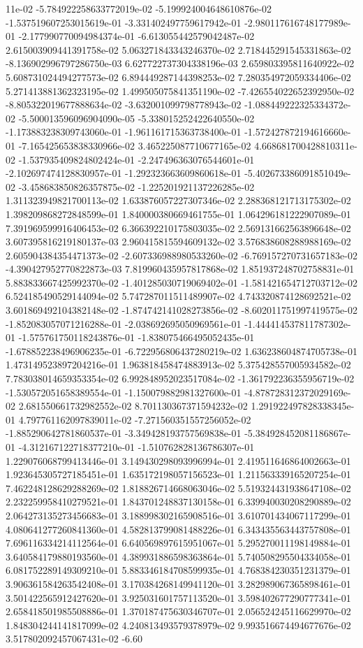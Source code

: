 11e-02	-5.784922258633772019e-02	-5.199924004648610876e-02	-1.537519607253015619e-01	-3.331402497759617942e-01	-2.980117616748177989e-01	-2.177990770094984374e-01	-6.613055442579042487e-02	2.615003909441391758e-02	5.063271843343246370e-02	2.718445291545331863e-02	-8.136902996797286750e-03	6.627722737304338196e-03	2.659803395811640922e-02	5.608731024494277573e-02	6.894449287144398253e-02	7.280354972059334406e-02	5.271413881362323195e-02	1.499505075841351190e-02	-7.426554022652392950e-02	-8.805322019677888634e-02	-3.632001099798778943e-02	-1.088449222325334372e-02	-5.500013596096904090e-05	-5.338015252422640550e-02	-1.173883238309743060e-01	-1.961161715363738400e-01	-1.572427872194616660e-01	-7.165425653838330966e-02	3.465225087710677165e-02	4.668681700428810311e-02	-1.537935409824802424e-01	-2.247496363076544601e-01	-2.102697474128830957e-01	-1.292323663609860618e-01	-5.402673386091851049e-02	-3.458683850826357875e-02	-1.225201921137226285e-02	1.311323949821700113e-02	1.633876057227307346e-02	2.288368121713175302e-02	1.398209868272848599e-01	1.840000380669461755e-01	1.064296181222907089e-01	7.391969599916406453e-02	6.366392210175803035e-02	2.569131662563896648e-02	3.607395816219180137e-03	2.960415815594609132e-02	3.576838608288988169e-02	2.605904384354471373e-02	-2.607336988980533260e-02	-6.769157270731657183e-02	-4.390427952770822873e-03	7.819960435957817868e-02	1.851937248702758831e-01	5.883833667425992370e-02	-1.401285030719069402e-01	-1.581421654712703712e-02	6.524185490529144094e-02	5.747287011511489907e-02	4.743320874128692521e-02	3.601869492104382148e-02	-1.874742141028273856e-02	-8.602011751997419575e-02	-1.852083057071216288e-01	-2.038692695050969561e-01	-1.444414537811787302e-01	-1.575761750118243876e-01	-1.838075466495052435e-01	-1.678852238496906235e-01	-6.722956806437280219e-02	1.636238604874705738e-01	1.473149523897204216e-01	1.963818458474883913e-02	5.375428557005934582e-02	7.783038014659353354e-02	6.992848952023517084e-02	-1.361792236355956719e-02	-1.530572051658389554e-01	-1.150079882981327600e-01	-4.878728312372029169e-02	2.681550661732982552e-02	8.701130367371594232e-02	1.291922497828338345e-01	4.797761162097839011e-02	-7.271560351557256052e-02	-1.885290642781860537e-01	-3.349428193757569838e-01	-5.384928452081186867e-01	-4.312167122718377210e-01	-1.510762828136786307e-01	1.229076068799413446e-01	3.149430298093996994e-01	2.419511646864002663e-01	1.923645305727185451e-01	1.635172198057156523e-01	1.211563339165207254e-01	7.462248128629288269e-02	1.818826714668063046e-02	5.519324431938647108e-02	2.232259958410279521e-01	1.843701248837130158e-01	6.339940030208290889e-02	2.064273135273456683e-01	3.188998302165908516e-01	3.610701434067117299e-01	4.080641277260841360e-01	4.582813799081488226e-01	6.343435563443757808e-01	7.696116334214112564e-01	6.640569897615951067e-01	5.295270011198149884e-01	3.640584179880193560e-01	4.389931886598363864e-01	5.740508295504334058e-01	6.081752289149309210e-01	5.883346184708599935e-01	4.768384230351231379e-01	3.906361584263542408e-01	3.170384268149941120e-01	3.282989067365898461e-01	3.501422565912427620e-01	3.925031601757113520e-01	3.598402677290777341e-01	2.658418501985508886e-01	1.370187475630346707e-01	2.056524245116629970e-02	1.848304244141817099e-02	4.240813493579378979e-02	9.993516674494677676e-02	3.517802092457067431e-02	-6.60